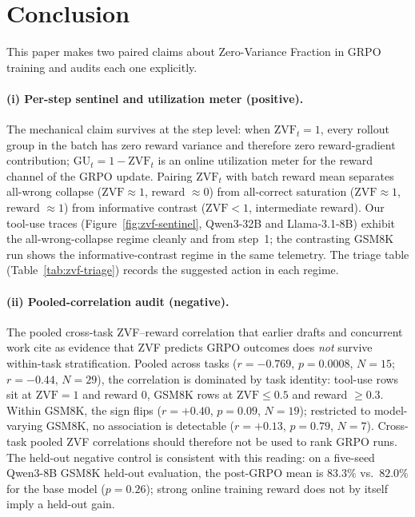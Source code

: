 \section{Conclusion}
\label{sec:conclusion}

This paper makes two paired claims about Zero-Variance Fraction in GRPO
training and audits each one explicitly.

\paragraph{(i) Per-step sentinel and utilization meter (positive).}
The mechanical claim survives at the step level: when $\mathrm{ZVF}_t = 1$,
every rollout group in the batch has zero reward variance and therefore
zero reward-gradient contribution; $\mathrm{GU}_t = 1-\mathrm{ZVF}_t$ is an
online utilization meter for the reward channel of the GRPO update.
Pairing $\mathrm{ZVF}_t$ with batch reward mean separates all-wrong
collapse ($\mathrm{ZVF}{\approx}1$, reward $\approx 0$) from all-correct
saturation ($\mathrm{ZVF}{\approx}1$, reward $\approx 1$) from informative
contrast ($\mathrm{ZVF}{<}1$, intermediate reward). Our tool-use traces
(Figure~\ref{fig:zvf-sentinel}, Qwen3-32B and Llama-3.1-8B) exhibit the
all-wrong-collapse regime cleanly and from step~1; the contrasting GSM8K
run shows the informative-contrast regime in the same telemetry. The
triage table (Table~\ref{tab:zvf-triage}) records the suggested action in
each regime.

\paragraph{(ii) Pooled-correlation audit (negative).}
The pooled cross-task ZVF--reward correlation that earlier drafts and
concurrent work cite as evidence that ZVF predicts GRPO outcomes does
\emph{not} survive within-task stratification. Pooled across tasks
($r{=}-0.769$, $p{=}0.0008$, $N{=}15$; $r{=}-0.44$, $N{=}29$), the
correlation is dominated by task identity: tool-use rows sit at
$\mathrm{ZVF}{=}1$ and reward $0$, GSM8K rows at $\mathrm{ZVF}{\le}0.5$ and
reward $\geq 0.3$. Within GSM8K, the sign flips ($r{=}+0.40$, $p{=}0.09$,
$N{=}19$); restricted to model-varying GSM8K, no association is detectable
($r{=}+0.13$, $p{=}0.79$, $N{=}7$). Cross-task pooled ZVF correlations
should therefore not be used to rank GRPO runs. The held-out negative
control is consistent with this reading: on a five-seed Qwen3-8B GSM8K
held-out evaluation, the post-GRPO mean is $83.3\%$ vs.\ $82.0\%$ for the
base model ($p{=}0.26$); strong online training reward does not by itself
imply a held-out gain.

